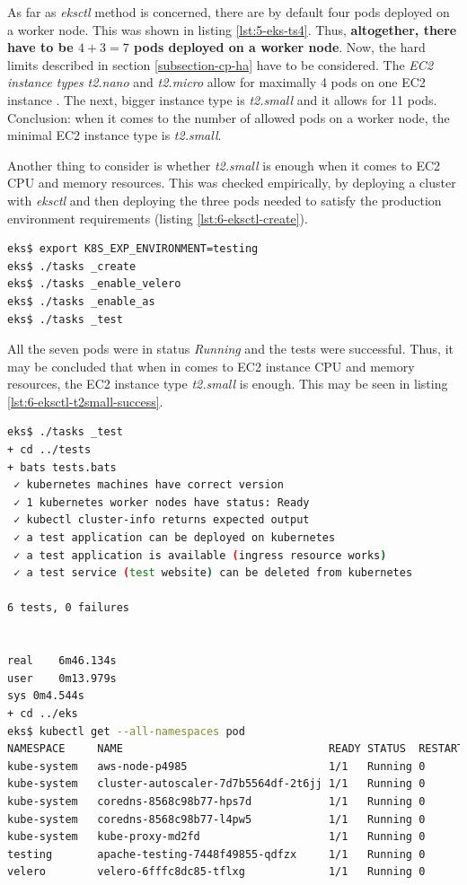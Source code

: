 As far as \textit{eksctl} method is concerned, there are by default four pods deployed on a worker node. This was shown in listing \ref{lst:5-eks-ts4}. Thus, \textbf{altogether, there have to be $4+3=7$ pods deployed on a worker node}. Now, the hard limits described in section \ref{subsection-cp-ha} have to be considered. The \textit{EC2 instance types} \textit{t2.nano} and \textit{t2.micro} allow for maximally 4 pods on one EC2 instance \cite{eks-hard-limits}. The next, bigger instance type is \textit{t2.small} and it allows for 11 pods. Conclusion: when it comes to the number of allowed pods on a worker node, the minimal EC2 instance type is \textit{t2.small}.

Another thing to consider is whether \textit{t2.small} is enough when it comes to EC2 CPU and memory resources. This was checked empirically, by deploying a cluster with \textit{eksctl} and then deploying the three pods needed to satisfy the production environment requirements (listing \ref{lst:6-eksctl-create}).
\begin{lstlisting}[basicstyle=\scriptsize,xleftmargin=0cm,label=lst:6-eksctl-create,caption={Deploying a production ready \textit{eksctl} cluster},captionpos=b,language=Bash]
eks$ export K8S_EXP_ENVIRONMENT=testing
eks$ ./tasks _create
eks$ ./tasks _enable_velero
eks$ ./tasks _enable_as
eks$ ./tasks _test
\end{lstlisting}

All the seven pods were in status \textit{Running} and the tests were successful. Thus, it may be concluded that when in comes to EC2 instance CPU and memory resources, the EC2 instance type \textit{t2.small} is enough. This may be seen in listing \ref{lst:6-eksctl-t2small-success}.
\begin{lstlisting}[basicstyle=\scriptsize,xleftmargin=0cm,label=lst:6-eksctl-t2small-success,caption={Verifying a production ready \textit{eksctl} cluster},captionpos=b,language=Bash]
eks$ ./tasks _test
+ cd ../tests
+ bats tests.bats
 ✓ kubernetes machines have correct version
 ✓ 1 kubernetes worker nodes have status: Ready
 ✓ kubectl cluster-info returns expected output
 ✓ a test application can be deployed on kubernetes
 ✓ a test application is available (ingress resource works)
 ✓ a test service (test website) can be deleted from kubernetes

6 tests, 0 failures


real	6m46.134s
user	0m13.979s
sys	0m4.544s
+ cd ../eks
eks$ kubectl get --all-namespaces pod
NAMESPACE     NAME                                READY STATUS  RESTARTS AGE
kube-system   aws-node-p4985                      1/1   Running 0        11m
kube-system   cluster-autoscaler-7d7b5564df-2t6jj 1/1   Running 0        3m2s
kube-system   coredns-8568c98b77-hps7d            1/1   Running 0        27m
kube-system   coredns-8568c98b77-l4pw5            1/1   Running 0        27m
kube-system   kube-proxy-md2fd                    1/1   Running 0        11m
testing       apache-testing-7448f49855-qdfzx     1/1   Running 0        111s
velero        velero-6fffc8dc85-tflxg             1/1   Running 0        3m54s
\end{lstlisting}

